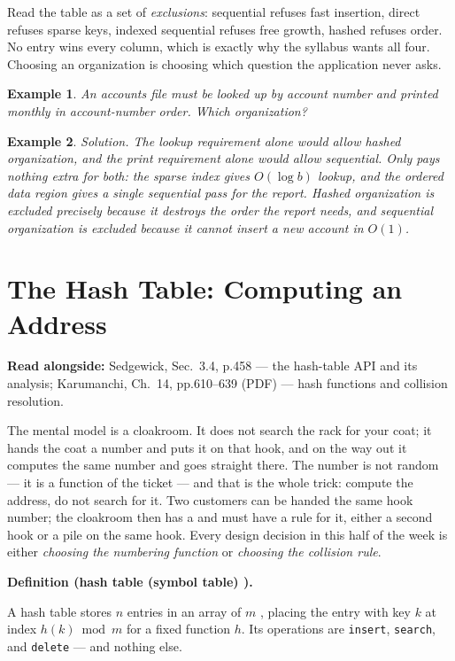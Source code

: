 \documentclass[11pt]{article}
\newtheorem{example}{Example}[section]
\newenvironment{definitionbox}[1]{%
  \par\noindent\textbf{Definition (#1).}\ \itshape
}{\par\vspace{0.3em}}
\begin{document}
Read the table as a set of \emph{exclusions}: sequential refuses fast insertion, direct refuses sparse keys, indexed sequential refuses free growth, hashed refuses order. No entry wins every column, which is exactly why the syllabus wants all four. Choosing an organization is choosing which question the application never asks.

\begin{example}
An accounts file must be looked up by account number \emph{and} printed monthly in account-number order. Which organization?
\end{example}

\begin{example}
\emph{Solution.} The lookup requirement alone would allow hashed organization, and the print requirement alone would allow sequential. Only  pays nothing extra for both: the sparse index gives $O(\log b)$ lookup, and the ordered data region gives a single sequential pass for the report. Hashed organization is excluded precisely because it destroys the order the report needs, and sequential organization is excluded because it cannot insert a new account in $O(1)$.
\end{example}

\section{The Hash Table: Computing an Address}

\textbf{Read alongside:} Sedgewick, Sec.~3.4, p.458 --- the hash-table API and its analysis; Karumanchi, Ch.~14, pp.610--639 (PDF) --- hash functions and collision resolution.

The mental model is a cloakroom. It does not search the rack for your coat; it hands the coat a number and puts it on that hook, and on the way out it computes the same number and goes straight there. The number is not random --- it is a function of the ticket --- and that is the whole trick: compute the address, do not search for it. Two customers can be handed the same hook number; the cloakroom then has a  and must have a rule for it, either a second hook or a pile on the same hook. Every design decision in this half of the week is either \emph{choosing the numbering function} or \emph{choosing the collision rule}.

\begin{definitionbox}{hash table (symbol table) \cite{Sedgewick2011_algorithms}}
A hash table stores $n$ entries in an array of $m$ , placing the entry with key $k$ at index $h(k) \bmod m$ for a fixed function $h$. Its operations are \texttt{insert}, \texttt{search}, and \texttt{delete} --- and nothing else.
\end{definitionbox}
\end{document}

